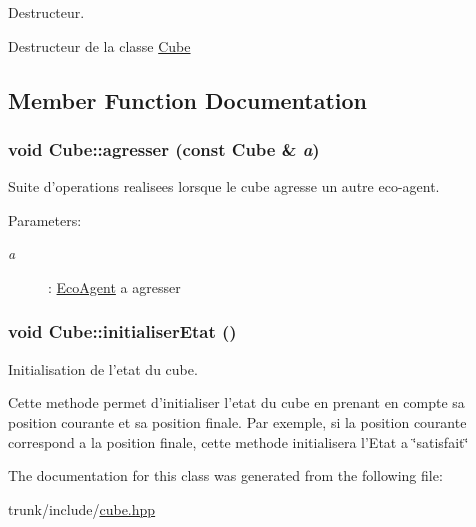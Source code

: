 Destructeur. 

Destructeur de la classe \hyperlink{classCube}{Cube} 

\subsection{Member Function Documentation}
\hypertarget{classCube_2b9c63b545c13c95b9a7f44c3c5147ad}{
\subsubsection[{agresser}]{\setlength{\rightskip}{0pt plus 5cm}void Cube::agresser (const {\bf Cube} \& {\em a})}}
\label{classCube_2b9c63b545c13c95b9a7f44c3c5147ad}


Suite d'operations realisees lorsque le cube agresse un autre eco-agent. 

\begin{Desc}
\item[Parameters:]
\begin{description}
\item[{\em a}]: \hyperlink{classEcoAgent}{EcoAgent} a agresser \end{description}
\end{Desc}
\hypertarget{classCube_51dbc3cc9578d3cf5f9e56cab24aff1f}{
\subsubsection[{initialiserEtat}]{\setlength{\rightskip}{0pt plus 5cm}void Cube::initialiserEtat ()}}
\label{classCube_51dbc3cc9578d3cf5f9e56cab24aff1f}


Initialisation de l'etat du cube. 

Cette methode permet d'initialiser l'etat du cube en prenant en compte sa position courante et sa position finale. Par exemple, si la position courante correspond a la position finale, cette methode initialisera l'Etat a \char`\"{}satisfait\char`\"{} 

The documentation for this class was generated from the following file:\begin{CompactItemize}
\item 
trunk/include/\hyperlink{cube_8hpp}{cube.hpp}\end{CompactItemize}
